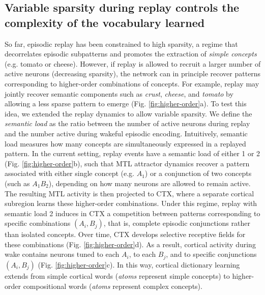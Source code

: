 \documentclass{article}
\begin{document}
\subsection*{Variable sparsity during replay controls the complexity of the vocabulary learned}
So far, episodic replay has been constrained to high sparsity, a regime that decorrelates episodic subpatterns and promotes the extraction of \textit{simple concepts} (e.g. tomato or cheese). However, if replay is allowed to recruit a larger number of active neurons (decreasing sparsity), the network can in principle recover patterns corresponding to higher-order combinations of concepts. For example, replay may jointly recover semantic components such as \textit{crust}, \textit{cheese}, and \textit{tomato} by allowing a less sparse pattern to emerge (Fig. \ref{fig:higher-order}a).
\newline\newline
To test this idea, we extended the replay dynamics to allow variable sparsity. We define the \textit{semantic load} as the ratio between the number of active neurons during replay and the number active during wakeful episodic encoding. Intuitively, semantic load measures how many concepts are simultaneously expressed in a replayed pattern. In the current setting, replay events have a semantic load of either 1 or 2 (Fig. \ref{fig:higher-order}b), such that MTL attractor dynamics recover a pattern associated  with either single concept (e.g. $A_1$) or a conjunction of two concepts (such as $A_1B_2$), depending on how many neurons are allowed to remain active. The resulting MTL activity is then projected to CTX, where a separate cortical subregion learns these higher-order combinations.
\newline\newline
Under this regime, replay with semantic load 2 induces in CTX a competition between patterns corresponding to specific combinations $(A_i,B_j)$, that is, complete episodic conjunctions rather than isolated concepts. Over time, CTX develops selective receptive fields for these combinations (Fig. \ref{fig:higher-order}d). As a result, cortical activity during wake contains neurons tuned to each $A_i$, to each $B_j$, and to specific conjunctions $(A_i,B_j)$ (Fig. \ref{fig:higher-order}c). In this way, cortical dictionary learning extends from simple cortical words (\textit{atoms} represent simple concepts) to higher-order compositional words (\textit{atoms} represent complex concepts).
\newline\newline
\end{document}
